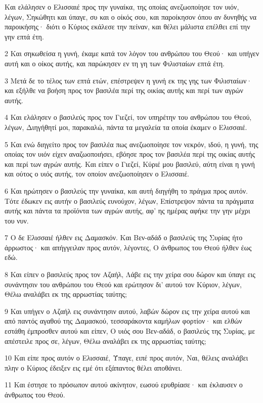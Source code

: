 \par Και ελάλησεν ο Ελισσαιέ προς την γυναίκα, της οποίας ανεζωοποίησε τον υιόν, λέγων, Σηκώθητι και ύπαγε, συ και ο οίκός σου, και παροίκησον όπου αν δυνηθής να παροικήσης· διότι ο Κύριος εκάλεσε την πείναν, και θέλει μάλιστα επέλθει επί την γην επτά έτη.
\par 2 Και σηκωθείσα η γυνή, έκαμε κατά τον λόγον του ανθρώπου του Θεού· και υπήγεν αυτή και ο οίκος αυτής, και παρώκησεν εν τη γη των Φιλισταίων επτά έτη.
\par 3 Μετά δε το τέλος των επτά ετών, επέστρεψεν η γυνή εκ της γης των Φιλισταίων· και εξήλθε να βοήση προς τον βασιλέα περί της οικίας αυτής και περί των αγρών αυτής.
\par 4 Και ελάλησεν ο βασιλεύς προς τον Γιεζεί, τον υπηρέτην του ανθρώπου του Θεού, λέγων, Διηγήθητί μοι, παρακαλώ, πάντα τα μεγαλεία τα οποία έκαμεν ο Ελισσαιέ.
\par 5 Και ενώ διηγείτο προς τον βασιλέα πως ανεζωοποίησε τον νεκρόν, ιδού, η γυνή, της οποίας τον υιόν είχεν αναζωοποιήσει, εβόησε προς τον βασιλέα περί της οικίας αυτής και περί των αγρών αυτής. Και είπεν ο Γιεζεί, Κύριέ μου βασιλεύ, αύτη είναι η γυνή και ούτος ο υιός αυτής, τον οποίον ανεζωοποίησεν ο Ελισσαιέ.
\par 6 Και ηρώτησεν ο βασιλεύς την γυναίκα, και αυτή διηγήθη το πράγμα προς αυτόν. Τότε έδωκεν εις αυτήν ο βασιλεύς ευνούχον, λέγων, Επίστρεψον πάντα τα πράγματα αυτής και πάντα τα προϊόντα των αγρών αυτής, αφ' ης ημέρας αφήκε την γην μέχρι του νυν.
\par 7 Ο δε Ελισσαιέ ήλθεν εις Δαμασκόν. Και Βεν-αδάδ ο βασιλεύς της Συρίας ήτο άρρωστος· και απήγγειλαν προς αυτόν, λέγοντες, Ο άνθρωπος του Θεού ήλθεν έως εδώ.
\par 8 Και είπεν ο βασιλεύς προς τον Αζαήλ, Λάβε εις την χείρα σου δώρον και ύπαγε εις συνάντησιν του ανθρώπου του Θεού και ερώτησον δι' αυτού τον Κύριον, λέγων, Θέλω αναλάβει εκ της αρρωστίας ταύτης;
\par 9 Και υπήγεν ο Αζαήλ εις συνάντησιν αυτού, λαβών δώρον εις την χείρα αυτού και από παντός αγαθού της Δαμασκού, τεσσαράκοντα καμήλων φορτίον· και ελθών εστάθη έμπροσθεν αυτού και είπεν, Ο υιός σου Βεν-αδάδ, ο βασιλεύς της Συρίας, με απέστειλε προς σε, λέγων, Θέλω αναλάβει εκ της αρρωστίας ταύτης;
\par 10 Και είπε προς αυτόν ο Ελισσαιέ, Ύπαγε, ειπέ προς αυτόν, Ναι, θέλεις αναλάβει πλην ο Κύριος έδειξεν εις εμέ ότι εξάπαντος θέλει αποθάνει.
\par 11 Και έστησε το πρόσωπον αυτού ακίνητον, εωσού ερυθρίασε· και έκλαυσεν ο άνθρωπος του Θεού.
